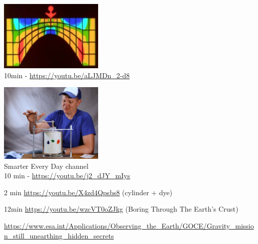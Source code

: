 
\begin{center}
\includegraphics[width=5cm]{images/youtube/superold}\\
10min - \url{https://youtu.be/aLJMDn_2-d8}
\end{center}

\begin{center}
\includegraphics[width=5cm]{images/youtube/smarter}\\
Smarter Every Day channel\\
10 min - \url{https://youtu.be/j2_dJY_mIys}
\end{center}


2 min \url{https://youtu.be/X4zd4Qpsbs8} (cylinder + dye)

12min \url{https://youtu.be/wzcVT0oZJkg} (Boring Through The Earth's Crust)


\url{https://www.esa.int/Applications/Observing_the_Earth/GOCE/Gravity_mission_still_unearthing_hidden_secrets}

